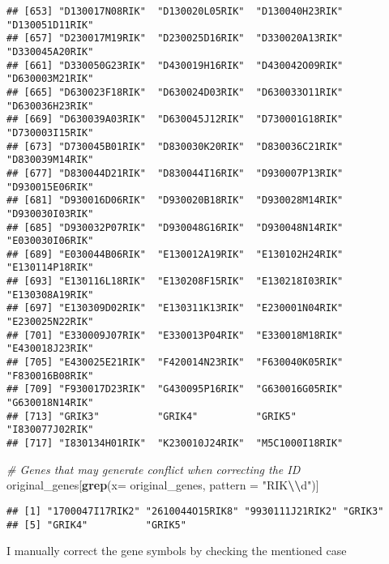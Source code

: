 \documentclass[
]{article}
\newenvironment{Shaded}{\begin{snugshade}}{\end{snugshade}}
\newcommand{\AttributeTok}[1]{\textcolor[rgb]{0.13,0.29,0.53}{#1}}
\newcommand{\CommentTok}[1]{\textcolor[rgb]{0.56,0.35,0.01}{\textit{#1}}}
\newcommand{\FunctionTok}[1]{\textcolor[rgb]{0.13,0.29,0.53}{\textbf{#1}}}
\newcommand{\NormalTok}[1]{#1}
\newcommand{\SpecialCharTok}[1]{\textcolor[rgb]{0.81,0.36,0.00}{\textbf{#1}}}
\newcommand{\StringTok}[1]{\textcolor[rgb]{0.31,0.60,0.02}{#1}}
\begin{document}
\begin{verbatim}
## [653] "D130017N08RIK"  "D130020L05RIK"  "D130040H23RIK"  "D130051D11RIK" 
## [657] "D230017M19RIK"  "D230025D16RIK"  "D330020A13RIK"  "D330045A20RIK" 
## [661] "D330050G23RIK"  "D430019H16RIK"  "D430042O09RIK"  "D630003M21RIK" 
## [665] "D630023F18RIK"  "D630024D03RIK"  "D630033O11RIK"  "D630036H23RIK" 
## [669] "D630039A03RIK"  "D630045J12RIK"  "D730001G18RIK"  "D730003I15RIK" 
## [673] "D730045B01RIK"  "D830030K20RIK"  "D830036C21RIK"  "D830039M14RIK" 
## [677] "D830044D21RIK"  "D830044I16RIK"  "D930007P13RIK"  "D930015E06RIK" 
## [681] "D930016D06RIK"  "D930020B18RIK"  "D930028M14RIK"  "D930030I03RIK" 
## [685] "D930032P07RIK"  "D930048G16RIK"  "D930048N14RIK"  "E030030I06RIK" 
## [689] "E030044B06RIK"  "E130012A19RIK"  "E130102H24RIK"  "E130114P18RIK" 
## [693] "E130116L18RIK"  "E130208F15RIK"  "E130218I03RIK"  "E130308A19RIK" 
## [697] "E130309D02RIK"  "E130311K13RIK"  "E230001N04RIK"  "E230025N22RIK" 
## [701] "E330009J07RIK"  "E330013P04RIK"  "E330018M18RIK"  "E430018J23RIK" 
## [705] "E430025E21RIK"  "F420014N23RIK"  "F630040K05RIK"  "F830016B08RIK" 
## [709] "F930017D23RIK"  "G430095P16RIK"  "G630016G05RIK"  "G630018N14RIK" 
## [713] "GRIK3"          "GRIK4"          "GRIK5"          "I830077J02RIK" 
## [717] "I830134H01RIK"  "K230010J24RIK"  "M5C1000I18RIK"
\end{verbatim}

\begin{Shaded}
\begin{Highlighting}[]
\CommentTok{\# Genes that may generate conflict when correcting the ID}
\NormalTok{original\_genes[}\FunctionTok{grep}\NormalTok{(}\AttributeTok{x=}\NormalTok{ original\_genes, }\AttributeTok{pattern =} \StringTok{"RIK}\SpecialCharTok{\textbackslash{}\textbackslash{}}\StringTok{d"}\NormalTok{)]}
\end{Highlighting}
\end{Shaded}

\begin{verbatim}
## [1] "1700047I17RIK2" "2610044O15RIK8" "9930111J21RIK2" "GRIK3"         
## [5] "GRIK4"          "GRIK5"
\end{verbatim}

I manually correct the gene symbols by checking the mentioned case
\end{document}
